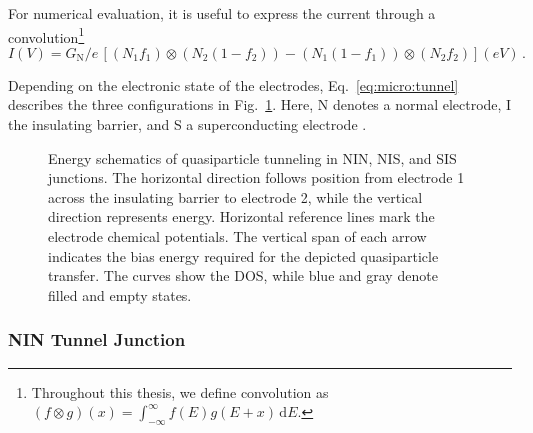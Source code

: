         For numerical evaluation, it is useful to express the current through a convolution\footnote{
            Throughout this thesis, we define convolution as $\left(f\otimes g\right)(x)=\int_{-\infty}^{\infty}f(E)g(E+x)\,\mathrm{d}E$.
            }
        \begin{equation}
            I(V)
            = G_\mathrm{N}/e\,
            \left[
                \left(N_1f_1\right)\otimes\left(N_2(1-f_2)\right)
                -
                \left(N_1(1-f_1)\right)\otimes\left(N_2f_2\right)
            \right](eV)\,.
            \label{eq:micro:tunnel-conv}
        \end{equation}

        Depending on the electronic state of the electrodes, Eq.~\eqref{eq:micro:tunnel} describes the three configurations in Fig.~\ref{fig:micro:tunnel-current}. Here, N denotes a normal electrode, I the insulating barrier, and S a superconducting electrode \cite{giaever_electron_1960,giaever_study_1961}.

        \begin{figure}[t]
            \centering
            \hfill
            \hfill
            \caption{
                Energy schematics of quasiparticle tunneling in NIN, NIS, and SIS junctions. The horizontal direction follows position from electrode 1 across the insulating barrier to electrode 2, while the vertical direction represents energy. Horizontal reference lines mark the electrode chemical potentials. The vertical span of each arrow indicates the bias energy required for the depicted quasiparticle transfer. The curves show the DOS, while blue and gray denote filled and empty states.
            }
            \label{fig:micro:tunnel-current}
        \end{figure}

        \subsubsection*{NIN Tunnel Junction}

